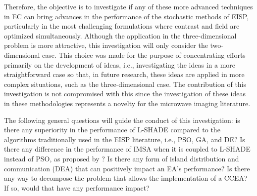 			Therefore, the objective is to investigate if any of these more advanced techniques in EC can bring advances in the performance of the stochastic methods of EISP, particularly in the most challenging formulations where contrast and field are optimized simultaneously. Although the application in the three-dimensional problem is more attractive, this investigation will only consider the two-dimensional case. This choice was made for the purpose of concentrating efforts primarily on the development of ideas, i.e., investigating the ideas in a more straightforward case so that, in future research, these ideas are applied in more complex situations, such as the three-dimensional case. The contribution of this investigation is not compromised with this since the investigation of these ideas in these methodologies represents a novelty for the microwave imaging literature.
			
			The following general questions will guide the conduct of this investigation: is there any superiority in the performance of L-SHADE compared to the algorithms traditionally used in the EISP literature, i.e., PSO, GA, and DE? Is there any difference in the performance of IMSA when it is coupled to L-SHADE instead of PSO, as proposed by \cite{salucci2017multifrequency}? Is there any form of island distribution and communication (DEA) that can positively impact an EA's performance? Is there any way to decompose the problem that allows the implementation of a CCEA? If so, would that have any performance impact?
			
